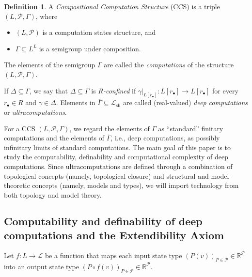 \documentclass[psamsfonts]{amsart}
\theoremstyle{definition}
\newtheorem{defn}[thm]{Definition}
\theoremstyle{remark}
\numberwithin{equation}{section}
\begin{document}
\begin{defn}
\label{D:CCS}
A \emph{Compositional Computation Structure} (CCS) is a triple $(L,\mathcal{P},\Gamma)$, where
\begin{itemize}
\item
 $(L,\mathcal{P})$ is a computation states structure, and
 \item
 $\Gamma\subseteq L^L$ is a semigroup under composition.
\end{itemize}

The elements of the  semigroup $\Gamma$ are called the \emph{computations} of the structure $(L,\mathcal{P},\Gamma)$.

If $\Delta\subseteq\Gamma$, we say that $\Delta\subseteq\Gamma$ is \emph{$R$-confined} if $\gamma|_{L[r_\bullet]}:L[r_\bullet]\to L[r_\bullet]$ for every $r_\bullet\in R$ and $\gamma\in \Delta$.
Elements in $\overline{\Gamma}\subseteq \mathcal{L}_{\text{sh}}$ are called (real-valued) \emph{deep computations} or \emph{ultracomputations}.

\end{defn}

For a CCS $(L,\mathcal{P},\Gamma)$, we regard the elements of $\Gamma$ as ``standard'' finitary computations and the elements of $\overline{\Gamma}$, i.e., deep computations, as possibly infinitary limits of standard computations.
The main goal of this paper is to study the computability, definability and computational complexity of deep computations.
Since ultracomputations are defined through a combination of topological concepts (namely, topological closure) and structural and model-theoretic concepts (namely, models and types), we will import technology from both topology and model theory.

\subsection{Computability and definability of deep computations and the Extendibility Axiom}

Let  $f: L\to \mathcal{L}$ be a function that maps each input state type  $(P(v))_{P\in \mathcal{P}}\in\mathbb{R}^\mathcal{P}$ into an output state type $(P\circ f (v))_{P\in \mathcal{P}}\in\mathbb{R}^\mathcal{P}$.
 
\end{document}

